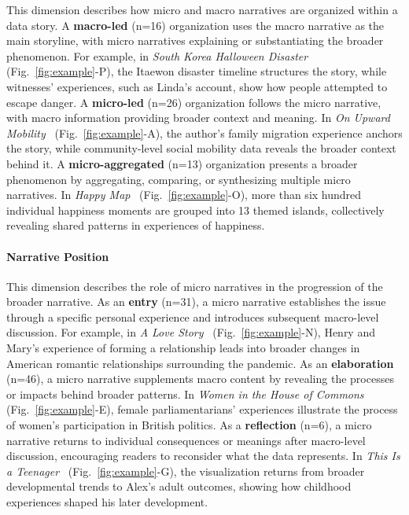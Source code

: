 This dimension describes how micro and macro narratives are organized within a data story. A \textbf{macro-led} (n=16) organization uses the macro narrative as the main storyline, with micro narratives explaining or substantiating the broader phenomenon. For example, in \textit{South Korea Halloween Disaster}~\cite{smith2022seoul} (Fig.~\ref{fig:example}-P), the Itaewon disaster timeline structures the story, while witnesses’ experiences, such as Linda’s account, show how people attempted to escape danger. A \textbf{micro-led} (n=26) organization follows the micro narrative, with macro information providing broader context and meaning. In \textit{On Upward Mobility}~\cite{williams2022upwardmobility} (Fig.~\ref{fig:example}-A), the author’s family migration experience anchors the story, while community-level social mobility data reveals the broader context behind it. A \textbf{micro-aggregated} (n=13) organization presents a broader phenomenon by aggregating, comparing, or synthesizing multiple micro narratives. In \textit{Happy Map}~\cite{happymap2026} (Fig.~\ref{fig:example}-O), more than six hundred individual happiness moments are grouped into 13 themed islands, collectively revealing shared patterns in experiences of happiness.

\paragraph{\textbf{\textcolor{imp}{Narrative Position}}}

This dimension describes the role of micro narratives in the progression of the broader narrative. As an \textbf{entry} (n=31), a micro narrative establishes the issue through a specific personal experience and introduces subsequent macro-level discussion. For example, in \textit{A Love Story}~\cite{chang2026love} (Fig.~\ref{fig:example}-N), Henry and Mary’s experience of forming a relationship leads into broader changes in American romantic relationships surrounding the pandemic. As an \textbf{elaboration} (n=46), a micro narrative supplements macro content by revealing the processes or impacts behind broader patterns. In \textit{Women in the House of Commons}~\cite{dsouza2018women} (Fig.~\ref{fig:example}-E), female parliamentarians’ experiences illustrate the process of women’s participation in British politics. As a \textbf{reflection} (n=6), a micro narrative returns to individual consequences or meanings after macro-level discussion, encouraging readers to reconsider what the data represents. In \textit{This Is a Teenager}~\cite{chang2024teenager} (Fig.~\ref{fig:example}-G), the visualization returns from broader developmental trends to Alex’s adult outcomes, showing how childhood experiences shaped his later development.


